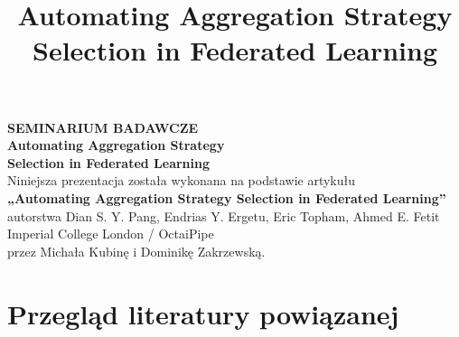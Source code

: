 \documentclass[9pt,aspectratio=169]{beamer}
\title{Automating Aggregation Strategy Selection in Federated Learning}
\author{}
\date{}
\newcommand{\sekcjaaktualna}{}
\newcommand{\ustawsekcje}[1]{\renewcommand{\sekcjaaktualna}{#1}}
\begin{document}
\begin{frame}[plain]
\begin{center}
\vspace{0.4cm}
{\small\bfseries\textcolor{primarypurple}{SEMINARIUM BADAWCZE}}\\[10pt]
{\Large\bfseries\textcolor{darknavy}{Automating Aggregation Strategy\\ Selection in Federated Learning}}\\[14pt]
{\footnotesize\textcolor{midgray}{Niniejsza prezentacja została wykonana na podstawie artykułu\\
\textbf{„Automating Aggregation Strategy Selection in Federated Learning”}\\
autorstwa Dian S. Y. Pang, Endrias Y. Ergetu, Eric Topham, Ahmed E. Fetit\\
Imperial College London / OctaiPipe\\
przez Michała Kubinę i Dominikę Zakrzewską.}}\\[14pt]
\end{center}
\end{frame}

\ustawsekcje{Sekcja 1: Przegląd literatury powiązanej}
\section{Przegląd literatury powiązanej}
\end{document}
